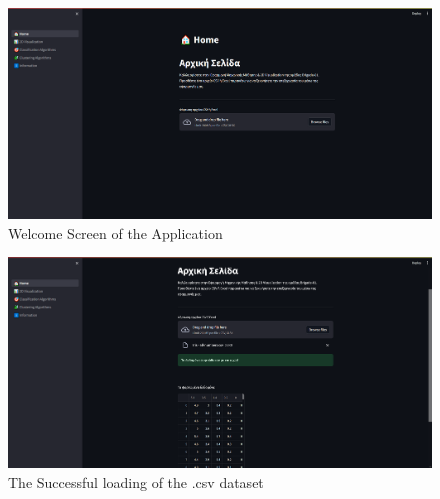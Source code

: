 \documentclass[unnumsec,webpdf,contemporary,large]{oup-authoring-template}%
\theoremstyle{thmstyleone}%
\theoremstyle{thmstyletwo}%
\theoremstyle{thmstylethree}%
\begin{document}
\begin{figure}
    \centering
    \includegraphics[width=1\linewidth]{welcoming-screen.png}
    \caption{Welcome Screen of the Application}
    \label{fig:welcome-screen}
\end{figure}

\begin{figure}
    \centering
    \includegraphics[width=1\linewidth]{csv-loaded.png}
    \caption{The Successful loading of the .csv dataset}
    \label{fig:csv-loaded}
\end{figure}
\end{document}
